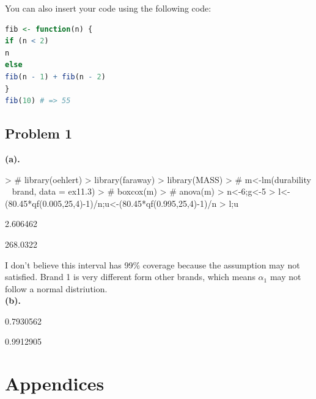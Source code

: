 \documentclass[11pt a4paper]{article}
\begin{document}
You can also insert your code using the following code: 

\begin{lstlisting}[language=R]
fib <- function(n) {
if (n < 2)
n
else
fib(n - 1) + fib(n - 2)
}
fib(10) # => 55
\end{lstlisting}



\subsection*{Problem 1}  %

\textbf{(a).}
\begin{Schunk}
\begin{Sinput}
> # library(oehlert)
>   library(faraway)
>   library(MASS)
> # m<-lm(durability ~ brand, data = ex11.3)
> # boxcox(m)
> # anova(m)
> n<-6;g<-5
> l<-(80.45*qf(0.005,25,4)-1)/n;u<-(80.45*qf(0.995,25,4)-1)/n
> l;u
\end{Sinput}
\begin{Soutput}
[1] 2.606462
\end{Soutput}
\begin{Soutput}
[1] 268.0322
\end{Soutput}
\end{Schunk}
I don't believe this interval has 99\% coverage because the assumption may not satisfied. Brand 1 is very different form other brands, which means $\alpha_1$ may not follow a normal distriution.\\

\textbf{(b).}
\begin{Schunk}
\begin{Soutput}
[1] 0.7930562
\end{Soutput}
\begin{Soutput}
[1] 0.9912905
\end{Soutput}
\end{Schunk}








\nocite*{}  




\newpage
\section*{Appendices}
\end{document}
